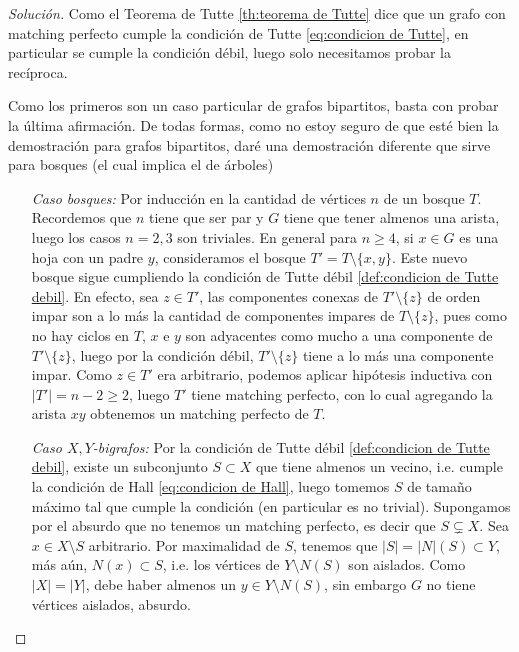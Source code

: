 \documentclass[12pt]{report}
\theoremstyle{plain}
\theoremstyle{definition}
\newenvironment{solution}{\begin{proof}[Solución]}{\end{proof}}
\newcommand{\abs}[1]{\left \vert #1 \right \vert}
\begin{document}
\begin{solution}
Como el Teorema de Tutte \ref{th:teorema de Tutte} dice que un grafo con matching perfecto cumple la condición de Tutte \eqref{eq:condicion de Tutte}, en particular se cumple la condición débil, luego solo necesitamos probar la recíproca.

Como los primeros son un caso particular de grafos bipartitos, basta con probar la última afirmación. De todas formas, como no estoy seguro de que esté bien la demostración para grafos bipartitos, daré una demostración diferente que sirve para bosques (el cual implica el de árboles)

\begin{enumerate}[(i)]
\item[\textit{Caso bosques:}] Por inducción en la cantidad de vértices $n$ de un bosque $T$. Recordemos que $n$ tiene que ser par y $G$ tiene que tener almenos una arista, luego los casos $n = 2,3$ son triviales. En general para $n \geq 4$, si $x \in G$ es una hoja con un padre $y$, consideramos el bosque $T' = T \setminus \{x,y\}$. Este nuevo bosque sigue cumpliendo la condición de Tutte débil \ref{def:condicion de Tutte debil}. En efecto, sea $z \in T'$, las componentes conexas de $T' \setminus \{z\}$ de orden impar son a lo más la cantidad de componentes impares de $T \setminus \{z\}$, pues como no hay ciclos en $T$, $x$ e $y$ son adyacentes como mucho a una componente de $T' \setminus \{z\}$, luego por la condición débil, $T' \setminus \{z\}$ tiene a lo más una componente impar. Como $z\in T'$ era arbitrario, podemos aplicar hipótesis inductiva con $ \abs{T'} = n -2 \geq 2$, luego $T'$ tiene matching perfecto, con lo cual agregando la arista $xy$ obtenemos un matching perfecto de $T$.
\item[\textit{Caso $X,Y$-bigrafos:}] Por la condición de Tutte débil \ref{def:condicion de Tutte debil}, existe un subconjunto $S \subset X$ que tiene almenos un vecino, i.e. cumple la condición de Hall \eqref{eq:condicion de Hall}, luego tomemos $S$ de tamaño máximo tal que cumple la condición (en particular es no trivial). Supongamos por el absurdo que no tenemos un matching perfecto, es decir que $S \subsetneq X$. Sea $x \in X \setminus S$ arbitrario. Por maximalidad de $S$, tenemos que $\abs S = \abs N (S) \subset Y$, más aún, $N (x) \subset S$, i.e. los vértices de $Y \setminus N(S)$ son aislados. Como $\abs X = \abs Y$, debe haber almenos un $y \in Y \setminus N(S)$, sin embargo $G$ no tiene vértices aislados, absurdo.

\end{enumerate}
\end{solution}
\end{document}
